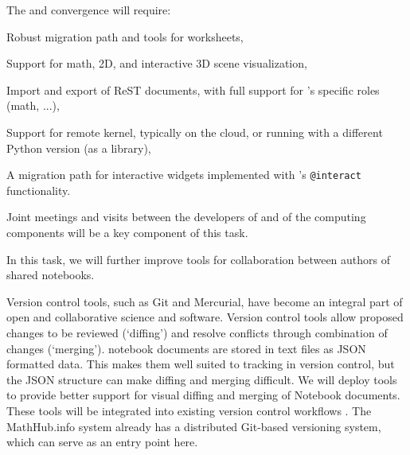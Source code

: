 \begin{workpackage}
\begin{tasklist}
\begin{task}[title=Uniform notebook interface for all interactive
  components,id=ipython-kernels,lead=PS, partners={SR,UK,USH,USO,LL,SA,UV},
  PM=24, wphases=0-36]
  The \Sage and \Jupyter convergence  will
  require:
  \begin{compactitem}
  \item Robust migration path and tools for \Sage worksheets,
  \item Support for math, 2D, and interactive 3D scene visualization,
  \item Import and export of ReST documents, with full support for
    \Sage's specific roles (math, ...),
  \item Support for remote \Sage kernel, typically on the cloud, or
    running with a different Python version (\Sage as a library),
  \item A migration path for interactive widgets implemented with
    \Sage's \texttt{@interact} functionality.
  \end{compactitem}

  Joint meetings and visits between the developers of \Jupyter and of
  the computing components will be a key component of this task.

\end{task}

\begin{task}[id=notebook-collab,title=Notebook improvements for collaboration,lead=SR, partners={PS,USH,JU,USO}, PM=18, wphases=0-24]

  In this task, we will further improve tools for collaboration
  between authors of shared \Jupyter notebooks.

  Version control tools, such as Git and Mercurial, have become an
  integral part of open and collaborative science and
  software. Version control tools allow proposed changes to be
  reviewed (`diffing') and resolve conflicts through combination of
  changes (`merging'). \Jupyter notebook documents are stored in text
  files as JSON formatted data. This makes them well suited to
  tracking in version control, but the JSON structure can make diffing
  and merging difficult. We will deploy tools to provide better
  support for visual diffing and merging of Notebook documents. These
  tools will be integrated into existing version control workflows
  . The MathHub.info system already has
  a distributed Git-based versioning system, which can serve as an
  entry point here.


\end{task}
\end{tasklist}
\end{workpackage}
